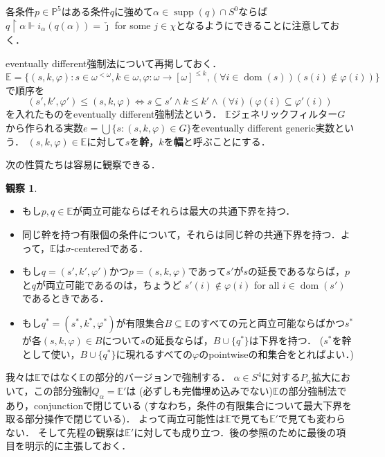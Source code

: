 \documentclass[uplatex,dvipdfmx]{jsarticle}
\newcommand{\dom}{\operatorname{dom}}
\newcommand\forces{\Vdash}
\newcommand{\supp}{\operatorname{supp}}
\newcommand{\Eor}{\mathbb{E}}
\newcommand{\Pa}{\mathbb{P}^5}
\renewcommand\subset{\subseteq}
\theoremstyle{definition}
\newtheorem{observation}[thm]{観察}
\begin{document}
	各条件$p\in \Pa$はある条件$q$に強めて$\alpha\in \supp(q)\cap S^0$ならば $q\restriction\alpha\forces i_\alpha(q(\alpha))=\check \jmath$ for some 
	$j\in\chi$となるようにできることに注意しておく．
	
	eventually different強制法について再掲しておく．
	$\mathbb{E} = \{ (s,k,\varphi) : s \in \omega^{<\omega}, k \in \omega, \varphi \colon \omega \to [\omega]^{\le k}, (\forall i \in \dom(s))(s(i) \not \in \varphi(i)) \}$で順序を
	\[
	(s', k', \varphi') \le (s, k, \varphi) \iff s \subset s' \land k \le k' \land (\forall i)(\varphi(i) \subset \varphi'(i))
	\]
	を入れたものをeventually different強制法という．	
	$\mathbb{E}$ジェネリックフィルター$G$から作られる実数$e = \bigcup \{ s  : (s, k, \varphi) \in G \}$をeventually different generic実数という．
	$(s, k, \varphi) \in \mathbb{E}$に対して$s$を\textbf{幹}，$k$を\textbf{幅}と呼ぶことにする．
	
	次の性質たちは容易に観察できる．
	\begin{observation}
	\begin{itemize}
		\item \label{compat.a} もし$p,q\in \Eor$が両立可能ならばそれらは最大の共通下界を持つ． 
		\item \label{compat.b} 同じ幹を持つ有限個の条件について，それらは同じ幹の共通下界を持つ．よって，$\Eor$は$\sigma$-centeredである．
		\item もし$q=(s',k',\varphi')$かつ$p=(s,k,\varphi)$であって$s'$が$s$の延長であるならば，$p$と$q$が両立可能であるのは，ちょうど
		$s'(i)\notin \varphi(i)$ for all $i\in\dom(s')$であるときである．
		\item  \label{compat.c}  もし$q^* =(s^*,k^*,\varphi^ *)$が有限集合$B\subseteq \Eor$のすべての元と両立可能ならばかつ$s^*$が各$(s,k,\varphi)\in B$について$s$の延長ならば，$B\cup \{q^*\}$は下界を持つ． 
		($s^*$を幹として使い，$B\cup \{q^ *\}$に現れるすべての$\varphi$のpointwiseの和集合をとればよい．)
	\end{itemize}
	\end{observation}

	我々は$\Eor$ではなく$\Eor$の部分的バージョンで強制する．
	$\alpha \in S^4$に対する$P_\alpha$拡大において，この部分強制$Q_\alpha=\Eor'$は
	(必ずしも完備埋め込みでない)$\Eor$の部分強制法であり，conjunctionで閉じている
	(すなわち，条件の有限集合について最大下界を取る部分操作で閉じている)．
	よって両立可能性は$\Eor$で見ても$\Eor'$で見ても変わらない．
	そして先程の観察は$\Eor'$に対しても成り立つ．後の参照のために最後の項目を明示的に主張しておく．
	
\end{document}
